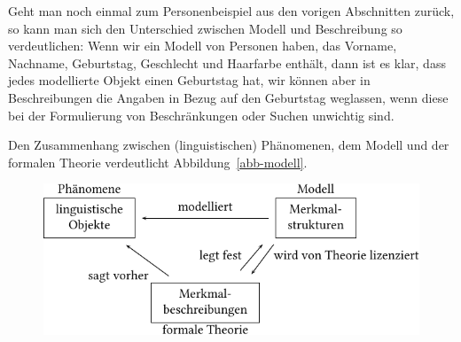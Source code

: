 Geht man noch einmal zum Personenbeispiel aus den vorigen Abschnitten zurück,
so kann man sich den Unterschied zwischen Modell und Beschreibung so verdeutlichen:
Wenn wir ein Modell von Personen haben, das Vorname, Nachname, Geburtstag,
Geschlecht und Haarfarbe enthält, dann ist es klar, dass jedes modellierte Objekt
einen Geburtstag hat, wir können aber in Beschreibungen die Angaben in Bezug
auf den Geburtstag weglassen, wenn diese bei der Formulierung von Beschränkungen
oder Suchen unwichtig sind.

Den Zusammenhang zwischen (linguistischen) Phänomenen, dem Modell
und der formalen Theorie verdeutlicht Abbildung~\vref{abb-modell}.
\begin{figure}[htbp]
\centerline{%
\includegraphics{Figures/model-theory-phenomenon-crop}
}

\end{figure}
